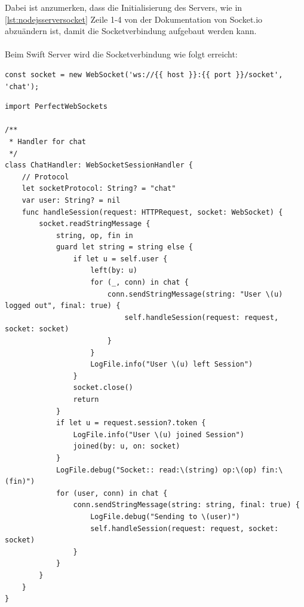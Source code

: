 Dabei ist anzumerken, dass die Initialisierung des Servers, wie in \ref{lst:nodejsserversocket} Zeile 1-4 von der Dokumentation von Socket.io \parencite{socketio} abzuändern ist, damit die Socketverbindung aufgebaut werden kann.\\\\
Beim Swift Server wird die Socketverbindung wie folgt erreicht:


\begin{lstlisting}
const socket = new WebSocket('ws://{{ host }}:{{ port }}/socket', 'chat');
\end{lstlisting}


\begin{lstlisting}
import PerfectWebSockets

/**
 * Handler for chat
 */
class ChatHandler: WebSocketSessionHandler {
    // Protocol
    let socketProtocol: String? = "chat"
    var user: String? = nil
    func handleSession(request: HTTPRequest, socket: WebSocket) {
        socket.readStringMessage {
            string, op, fin in
            guard let string = string else {
                if let u = self.user {
                    left(by: u)
                    for (_, conn) in chat {
                        conn.sendStringMessage(string: "User \(u) logged out", final: true) {
                            self.handleSession(request: request, socket: socket)
                        }
                    }
                    LogFile.info("User \(u) left Session")
                }
                socket.close()
                return
            }
            if let u = request.session?.token {
                LogFile.info("User \(u) joined Session")
                joined(by: u, on: socket)
            }
            LogFile.debug("Socket:: read:\(string) op:\(op) fin:\(fin)")
            for (user, conn) in chat {
                conn.sendStringMessage(string: string, final: true) {
                    LogFile.debug("Sending to \(user)")
                    self.handleSession(request: request, socket: socket)
                }
            }
        }
    }
}
\end{lstlisting}

